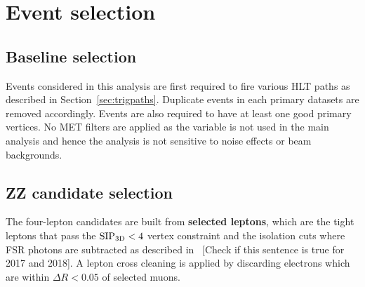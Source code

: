 \section{Event selection}
\label{sec:evtselection}

\subsection{Baseline selection}
Events considered in this analysis are first required to fire various HLT 
paths as described in Section~\ref{sec:trigpaths}. Duplicate events in 
each primary datasets are removed accordingly. Events are also required to 
have at least one good primary vertices. No MET filters are applied as 
the \met variable is not used in the main analysis and hence the analysis 
is not sensitive to noise effects or beam backgrounds.

\subsection{ZZ candidate selection}
\label{sec:zzcandsel}

The four-lepton candidates are built from {\bf selected leptons}, which  
are the tight leptons 
that pass the ${\rm SIP_{3D}} < 4$ vertex constraint
and the isolation cuts 
where FSR photons are subtracted as described in~\cite{AN-16-442,AN-17-342}
[Check if this sentence is true for 2017 and 2018].
A lepton cross cleaning is applied 
by discarding electrons which are within $\Delta R < 0.05$ of selected muons. 

